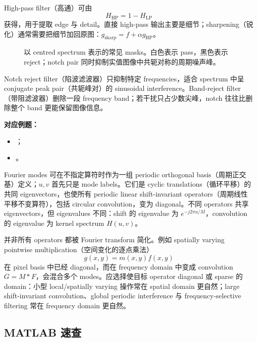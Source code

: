 High-pass filter（高通）可由
\[
  H_{\mathrm{HP}}=1-H_{\mathrm{LP}}
\]
获得，用于提取 edge 与 detail。直接 high-pass 输出主要是细节；sharpening（锐化）通常需要把细节加回原图：$g_{\mathrm{sharp}}=f+\alpha g_{\mathrm{HP}}$。

\begin{figure}[htbp]
  \centering
  \resizebox{0.96\textwidth}{!}{}
  \caption{以 centred spectrum 表示的常见 masks。白色表示 pass，黑色表示 reject；notch pair 同时抑制实值图像中共轭对称的周期噪声峰。}
  \label{fig:sc4061-l04-filter-masks}
\end{figure}

Notch reject filter（陷波滤波器）只抑制特定 frequencies，适合 spectrum 中呈 conjugate peak pair（共轭峰对）的 sinusoidal interference。Band-reject filter（带阻滤波器）删除一段 frequency band；若干扰只占少数尖峰，notch 往往比删除整个 band 更能保留图像信息。

\textbf{对应例题：}
\begin{itemize}
  \item {}；
  \item {}。
\end{itemize}


Fourier modes 可在不指定算符时作为一组 periodic orthogonal basis（周期正交基）定义；$u,v$ 首先只是 mode labels。它们是 cyclic translations（循环平移）的共同 eigenvectors，也使所有 periodic linear shift-invariant operators（周期线性平移不变算符），包括 circular convolution，变为 diagonal。不同 operators 共享 eigenvectors，但 eigenvalues 不同：shift 的 eigenvalue 为 $e^{-j2\pi u/M}$，convolution 的 eigenvalue 为 kernel spectrum $H(u,v)$。

并非所有 operators 都被 Fourier transform 简化。例如 spatially varying pointwise multiplication（空间变化的逐点乘法）
\[
  g(x,y)=m(x,y)f(x,y)
\]
在 pixel basis 中已经 diagonal，而在 frequency domain 中变成 convolution $G=M*F$，会混合多个 modes。应选择使目标 operator diagonal 或 sparse 的 domain：小型 local/spatially varying 操作常在 spatial domain 更自然；large shift-invariant convolution、global periodic interference 与 frequency-selective filtering 常在 frequency domain 更自然。

\subsection{MATLAB 速查}

